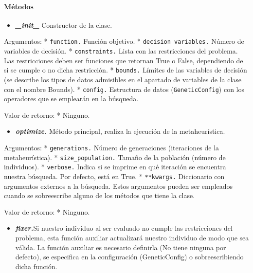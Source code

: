 \documentclass[11pt]{article}
\providecommand{\tightlist}{%
      \setlength{\itemsep}{0pt}\setlength{\parskip}{0pt}}
\begin{document}
\paragraph{Métodos}\label{muxe9todos}

\begin{itemize}
\tightlist
\item
  \emph{\textbf{\_\emph{init}\_}} Constructor de la clase.
\end{itemize}

Argumentos: * \texttt{function.} Función objetivo. *
\texttt{decision\_variables.} Número de variables de decisión. *
\texttt{constraints.} Lista con las restricciones del problema. Las
restricciones deben ser funciones que retornan True o False, dependiendo
de si se cumple o no dicha restricción. * \texttt{bounds.} Límites de
las variables de decisión (se describe los tipos de datos admisibles en
el apartado de variables de la clase con el nombre Bounds). *
\texttt{config.} Estructura de datos (\texttt{GeneticConfig}) con los
operadores que se emplearán en la búsqueda.

Valor de retorno: * Ninguno.

\begin{itemize}
\tightlist
\item
  \emph{\textbf{optimize.}} Método principal, realiza la ejecución de la
  metaheurística.
\end{itemize}

Argumentos: * \texttt{generations.} Número de generaciones (iteraciones
de la metaheurística). * \texttt{size\_population.} Tamaño de la
población (número de individuos). * \texttt{verbose.} Indica si se
imprime en qué iteración se encuentra nuestra búsqueda. Por defecto,
está en True. * \texttt{**kwargs.} Diccionario con argumentos externos a
la búsqueda. Estos argumentos pueden ser empleados cuando se
sobreescribe alguno de los métodos que tiene la clase.

Valor de retorno: * Ninguno.

\begin{itemize}
\tightlist
\item
  \emph{\textbf{fixer.}}Si nuestro individuo al ser evaluado no cumple
  las restricciones del problema, esta función auxiliar actualizará
  nuestro individuo de modo que sea válida. La función auxiliar es
  necesario definirla (No tiene ninguna por defecto), se especifica en
  la configuración (GeneticConfig) o sobreescribiendo dicha función.
\end{itemize}
\end{document}
